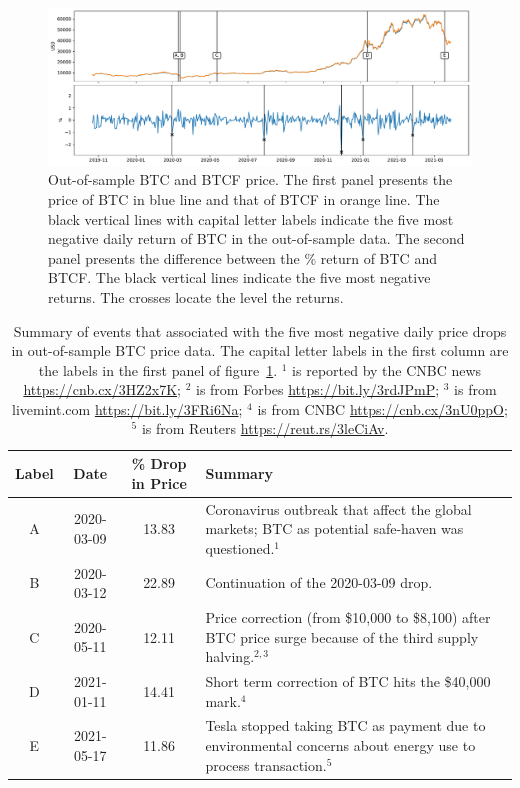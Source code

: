 \begin{figure}[t]
\includegraphics[width=\textwidth]{_pics/BTC_price.pdf}
  \caption{Out-of-sample BTC and BTCF price. The first panel presents the price of BTC in blue line and that of BTCF in orange line.
  The black vertical lines with capital letter labels indicate the five most negative daily return of BTC in the out-of-sample data.
  The second panel presents the difference between the \% return of BTC and BTCF.
  The black vertical lines indicate the five most negative returns.
  The crosses locate the level the returns.}
\label{fig:BTC_price}
\end{figure}

\begin{table}[!h]
    \centering
      \begin{tabularx}{.8\textwidth}{cccX}
        \toprule
        Label &   Date & \% Drop in Price &  Summary\\
        \midrule
        A &  2020-03-09 & 13.83 &  Coronavirus outbreak that affect the global markets; BTC as potential safe-haven was questioned.$^1$\\
        B &  2020-03-12 & 22.89 &  Continuation of the 2020-03-09 drop.  \\
        C &  2020-05-11 & 12.11 &  Price correction (from \$10,000 to \$8,100) after BTC price surge because of the third supply halving.$^{2,3}$ \\
        D &  2021-01-11 & 14.41 &  Short term correction of BTC hits the \$40,000 mark.$^4$\\
        E &  2021-05-17 & 11.86 &  Tesla stopped taking BTC as payment due to environmental concerns about energy use to process transaction.$^5$\\
        \bottomrule
      \end{tabularx}
        \caption{Summary of events that associated with the five most negative daily price drops in out-of-sample BTC price data.
        The capital letter labels in the first column are the labels in the first panel of figure~\ref{fig:BTC_price}.
        $^1$ is reported by the CNBC news \url{https://cnb.cx/3HZ2x7K}; $^2$ is from Forbes \url{https://bit.ly/3rdJPmP};
        $^3$ is from livemint.com \url{https://bit.ly/3FRi6Na};
        $^4$ is from CNBC \url{https://cnb.cx/3nU0ppO};
        $^5$ is from Reuters \url{https://reut.rs/3leCiAv}.
        }
        \label{tab:BTC_5min}
  \end{table}

